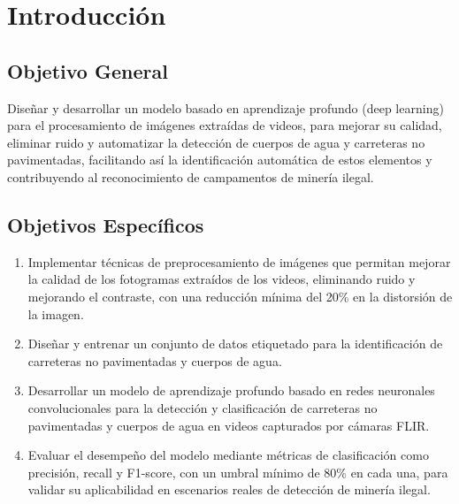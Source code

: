 \section{Introducción}

\subsection{Objetivo General}

Diseñar y desarrollar un modelo basado en aprendizaje profundo (deep learning) para el procesamiento de imágenes extraídas de videos, para mejorar su calidad, eliminar ruido y automatizar la detección de cuerpos de agua y carreteras no pavimentadas, facilitando así la identificación automática de estos elementos y contribuyendo al reconocimiento de campamentos de minería ilegal.

\subsection{Objetivos Específicos}

\begin{enumerate}
    \item Implementar técnicas de preprocesamiento de imágenes que permitan mejorar la calidad de los fotogramas extraídos de los videos, eliminando ruido y mejorando el contraste, con una reducción mínima del 20\% en la distorsión de la imagen. 
    \item Diseñar y entrenar un conjunto de datos etiquetado para la identificación de carreteras no pavimentadas y cuerpos de agua.
    \item Desarrollar un modelo de aprendizaje profundo basado en redes neuronales convolucionales para la detección y clasificación de carreteras no pavimentadas y cuerpos de agua en videos capturados por cámaras FLIR.
    \item Evaluar el desempeño del modelo mediante métricas de clasificación como precisión, recall y F1-score, con un umbral mínimo de 80\% en cada una, para validar su aplicabilidad en escenarios reales de detección de minería ilegal.
\end{enumerate}